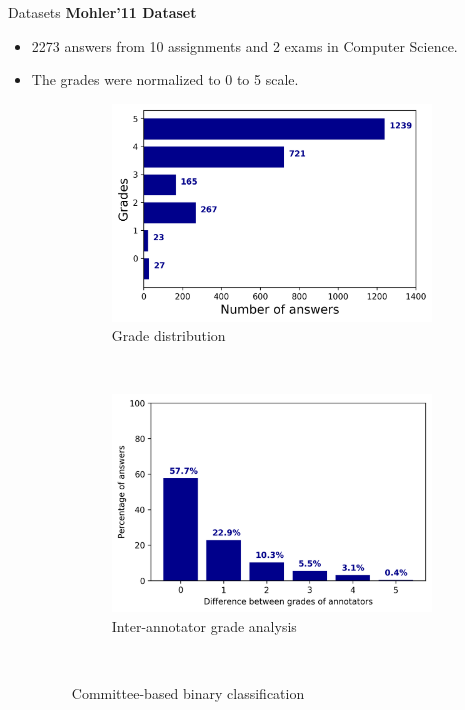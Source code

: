 \documentclass{beamer}
\begin{document}
\begin{frame}{Datasets}
\textbf{Mohler'11 Dataset \cite{Mohler2011}}
	\begin{itemize}
	\item 2273 answers from 10 assignments and 2 exams in Computer Science.
	\item The grades were normalized to 0 to 5 scale.	
	
		\begin{figure}[!htb]
			\begin{subfigure}[b]{0.35\textwidth}
				\includegraphics[width=\textwidth]{images/mohlergrades}
				\caption{Grade distribution}
				\label{mohlergrades}
			\end{subfigure}
			~
			\begin{subfigure}[b]{0.35\textwidth}
				\includegraphics[width=\textwidth]{images/mohlerdisagreement}
				\caption{Inter-annotator grade analysis \cite{Mohler2011}}
				\label{mohlerdisagreement}
			\end{subfigure}
			~
			\caption{Committee-based binary classification}
		\end{figure}
	\end{itemize}
\end{frame}
\end{document}
